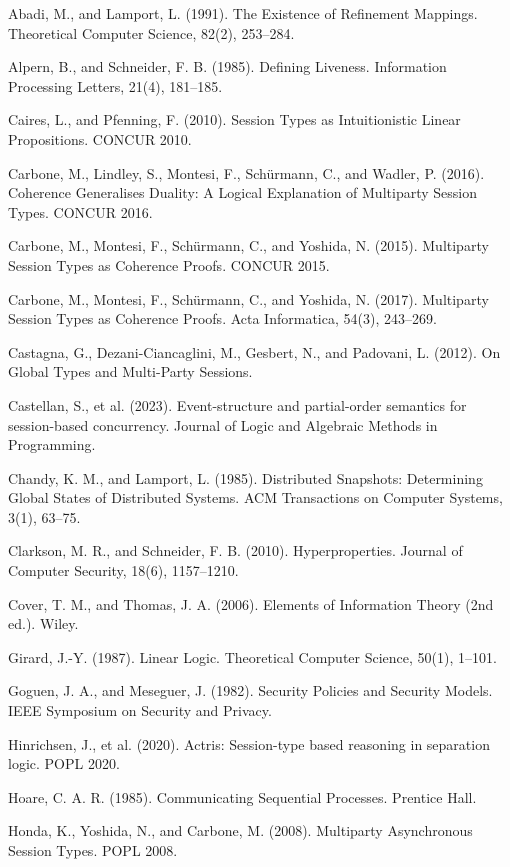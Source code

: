 \documentclass[a4paper,10pt,twocolumn,english]{article}
\numberwithin{equation}{section}
\theoremstyle{paperdef}
\theoremstyle{paperplain}
\theoremstyle{paperdef}
\theoremstyle{paperremark}
\theoremstyle{paperdef}
\newenvironment{citelist}{%
  \begin{list}{}{%
    \setlength{\leftmargin}{1.25em}%
    \setlength{\itemindent}{-1.25em}%
    \setlength{\itemsep}{2pt}%
    \setlength{\parsep}{0pt}%
    \setlength{\topsep}{3pt}}%
}{\end{list}}
\begin{document}
\begin{citelist}
	\item Abadi, M., and Lamport, L. (1991). The Existence of Refinement Mappings. Theoretical Computer Science, 82(2), 253--284.
	\item Alpern, B., and Schneider, F. B. (1985). Defining Liveness. Information Processing Letters, 21(4), 181--185.
	\item Caires, L., and Pfenning, F. (2010). Session Types as Intuitionistic Linear Propositions. CONCUR 2010.
	\item Carbone, M., Lindley, S., Montesi, F., Sch\"urmann, C., and Wadler, P. (2016). Coherence Generalises Duality: A Logical Explanation of Multiparty Session Types. CONCUR 2016.
	\item Carbone, M., Montesi, F., Sch\"urmann, C., and Yoshida, N. (2015). Multiparty Session Types as Coherence Proofs. CONCUR 2015.
	\item Carbone, M., Montesi, F., Sch\"urmann, C., and Yoshida, N. (2017). Multiparty Session Types as Coherence Proofs. Acta Informatica, 54(3), 243--269.
	\item Castagna, G., Dezani-Ciancaglini, M., Gesbert, N., and Padovani, L. (2012). On Global Types and Multi-Party Sessions.
	\item Castellan, S., et al. (2023). Event-structure and partial-order semantics for session-based concurrency. Journal of Logic and Algebraic Methods in Programming.
	\item Chandy, K. M., and Lamport, L. (1985). Distributed Snapshots: Determining Global States of Distributed Systems. ACM Transactions on Computer Systems, 3(1), 63--75.
	\item Clarkson, M. R., and Schneider, F. B. (2010). Hyperproperties. Journal of Computer Security, 18(6), 1157--1210.
	\item Cover, T. M., and Thomas, J. A. (2006). Elements of Information Theory (2nd ed.). Wiley.
	\item Girard, J.-Y. (1987). Linear Logic. Theoretical Computer Science, 50(1), 1--101.
	\item Goguen, J. A., and Meseguer, J. (1982). Security Policies and Security Models. IEEE Symposium on Security and Privacy.
	\item Hinrichsen, J., et al. (2020). Actris: Session-type based reasoning in separation logic. POPL 2020.
	\item Hoare, C. A. R. (1985). Communicating Sequential Processes. Prentice Hall.
	\item Honda, K., Yoshida, N., and Carbone, M. (2008). Multiparty Asynchronous Session Types. POPL 2008.

\end{citelist}
\end{document}
